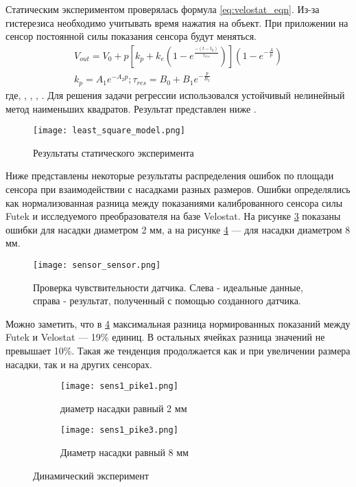 Статическим экспериментом проверялась формула \eqref{eq:velostat_eqn}. Из-за гистерезиса необходимо учитывать время нажатия на объект. При приложении на сенсор постоянной силы показания сенсора будут меняться.
\begin{align}
    \label{eq:velostat_eqn}
    V_{out} = V_0 + p[k_p + k_e(1-e^\frac{-(t-t_0)}{\tau_{res}})](1-e^{-\frac{A}{p}}) \\
    k_p = A_1e^{-A_2p}; \tau_{res} = B_0 + B_1e^{-\frac{p}{B_2}}
\end{align}
где,  , , , .
Для решения задачи регрессии использовался устойчивый нелинейный метод наименьших квадратов. Результат представлен ниже .

\begin{figure}[H]
    \centering\texttt{[image: least\_square\_model.png]}
    \caption{Результаты статического эксперимента}
    \label{fig:least_square_model.png}
\end{figure}

Ниже  представлены некоторые результаты распределения ошибок по площади сенсора при взаимодействии с насадками разных размеров. Ошибки определялись как нормализованная разница между показаниями калиброванного сенсора силы Futek и исследуемого преобразователя на базе Velostat. На рисунке \ref{fig:sens1_pike1} показаны ошибки для насадки диаметром 2 мм, а на рисунке \ref{fig:sens1_pike3} — для насадки диаметром 8 мм.

\begin{figure}[H]
    \centering\texttt{[image: sensor\_sensor.png]}\\
    \caption{Проверка чувствительности датчика. Слева - идеальные данные, справа - результат, полученный с помощью созданного датчика.}
    \label{fig:sensor_sensor}
    \end{figure}

Можно заметить, что в \ref{fig:sens1_pike3} максимальная разница нормированных показаний между Futek и Velostat --- 19\% единиц. В остальных ячейках разница значений не превышает 10\%. Такая же тенденция продолжается как и при увеличении размера насадки, так и на других сенсорах.


\begin{figure}[H]
    \begin{subfigure}{0.99\textwidth}
        \centering\texttt{[image: sens1\_pike1.png]}
        \caption{диаметр насадки равный 2 мм }
        \label{fig:sens1_pike1}
    \end{subfigure}

    \begin{subfigure}{0.99\textwidth}
        \centering\texttt{[image: sens1\_pike3.png]}
        \caption{Диаметр насадки равный 8 мм }
        \label{fig:sens1_pike3}
    \end{subfigure}
    \caption{Динамический эксперимент}
    \label{fig:dynamics_exp}
\end{figure}

